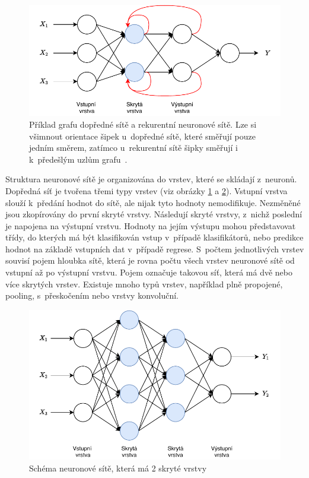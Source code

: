 \begin{figure}[H]
    \centering
    \includegraphics[scale=1.0]{obrazky-figures/feedforward_vs_recurrent.pdf}
    \caption{\label{fig:netcomparison}Příklad grafu dopředné sítě a rekurentní neuronové sítě. Lze si všimnout orientace šipek u~dopředné sítě, které směřují pouze jedním směrem, zatímco u~rekurentní sítě šipky směřují i k~předešlým uzlům grafu~\cite{FFandRecNN}.}
\end{figure}

Struktura neuronové sítě je organizována do vrstev, které se skládají z~neuronů. Dopředná síť je tvořena třemi typy vrstev (viz obrázky \ref{fig:netcomparison} a \ref{fig:mlp}). Vstupní vrstva slouží k~předání hodnot do sítě, ale nijak tyto hodnoty nemodifikuje. Nezměněné jsou zkopírovány do první skryté vrstvy. Následují skryté vrstvy, z~nichž poslední je napojena na výstupní vrstvu. Hodnoty na jejím výstupu mohou představovat třídy, do kterých má být klasifikován vstup v~případě klasifikátorů, nebo predikce hodnot na základě vstupních dat v~případě regrese. S~počtem jednotlivých vrstev souvisí pojem hloubka sítě, která je rovna počtu všech vrstev neuronové sítě od vstupní až po výstupní vrstvu. Pojem  označuje takovou síť, která má dvě nebo více skrytých vrstev. Existuje mnoho typů vrstev, například plně propojené, pooling, s~přeskočením nebo vrstvy konvoluční.

\begin{figure}[H]
    \centering
    \includegraphics[scale=1.0]{obrazky-figures/mlp.pdf}
    \caption{\label{fig:mlp}Schéma neuronové sítě, která má 2 skryté vrstvy}
\end{figure}


